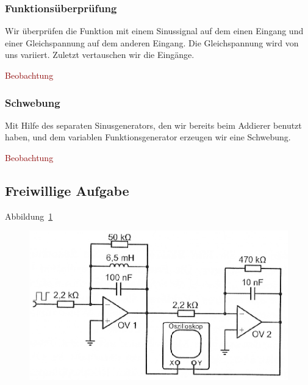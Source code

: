 \subsubsection{Funktionsüberprüfung}

Wir überprüfen die Funktion mit einem Sinussignal auf dem einen Eingang und
einer Gleichspannung auf dem anderen Eingang. Die Gleichspannung wird von uns
variiert. Zuletzt vertauschen wir die Eingänge.

\textcolor{darkred}{Beobachtung}

\subsubsection{Schwebung}

Mit Hilfe des separaten Sinusgenerators, den wir bereits beim Addierer benutzt
haben, und dem variablen Funktionsgenerator erzeugen wir eine Schwebung.

\textcolor{darkred}{Beobachtung}

\FloatBarrier
\subsection{Freiwillige Aufgabe}

Abbildung~\ref{fig:5-2}

\begin{figure}[htbp]
	\centering
	\includegraphics[width=.8\linewidth]{Anleitung/5-2.png}
	\caption{%
		\cite[Abbildung~5.2]{physik313-Anleitung}
	}
	\label{fig:5-2}
\end{figure}


\FloatBarrier
\IfFileExists{\bibliographyfile}{
	
}{}



